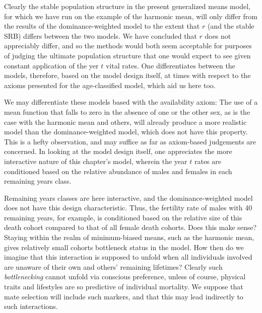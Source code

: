 \FloatBarrier

Clearly the stable population structure in the present generalized means model,
for which we have run on the example of the harmonic mean, will only differ from
the results of the dominance-weighted model to the extent that $r$ (and
the stable SRB) differs between the two models. We have concluded that $r$ does
not appreciably differ, and so the methods would both seem acceptable for
purposes of judging the ultimate population structure that one would expect to
see given constant application of the yer $t$ vital rates. One differentiates
between the models, therefore, based on the model design itself, at times with
respect to the axioms presented for the age-classified model, which aid us here
too. 

We may differentiate these models based with the availability axiom:  The use of
a mean function that falls to zero in the absence of one or the other sex, as is the 
case with the harmonic mean and others, will already produce a more
realistic model than the dominance-weighted model, which does not have this
property. This is a hefty observation, and may suffice as far as axiom-based
judgements are concerned. In looking at the model design itself, one appreciates
the more interactive nature of this chapter's model, wherein the year $t$ rates
are conditioned based on the relative abundance of males and females in each
remaining years class. 

Remaining years classes are here interactive, and
the dominance-weighted model does not have this design characteristic. Thus, the
fertility rate of males with 40 remaining years, for example, is conditioned
based on the relative size of this death cohort compared to that of all female
death cohorts. Does this make sense? Staying within the realm of minimum-biased
means, such as the harmonic mean, gives relatively small cohorts
bottleneck status in the model. How then do we imagine that this interaction is
supposed to unfold when all individuals involved are unaware of their own and
others' remaining lifetimes? Clearly such \textit{bottlenecking} cannot unfold
via conscious preference, unless of course, physical traits and lifestyles are
so predictive of individual mortality. We suppose that mate selection will
include such markers, and that this may lead indirectly to such interactions.

